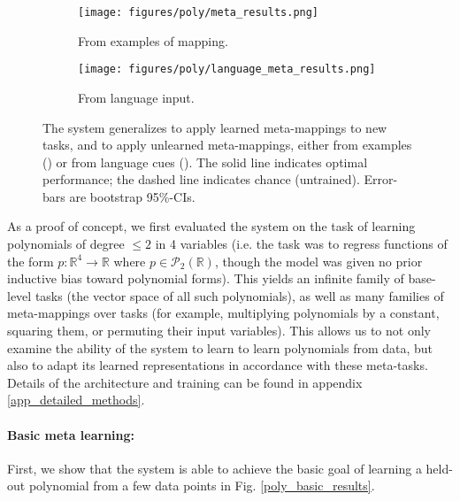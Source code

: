 \documentclass{article}
\begin{document}
\begin{figure}
\centering
\begin{subfigure}{0.5\textwidth}
\texttt{[image: figures/poly/meta\_results.png]}
\caption{From examples of mapping.}
\label{poly_meta_map_results_examples}
\end{subfigure}%
\begin{subfigure}{0.5\textwidth}
\texttt{[image: figures/poly/language\_meta\_results.png]}
\caption{From language input.}
\label{poly_meta_map_results_language}
\end{subfigure}
\caption{The system generalizes to apply learned meta-mappings to new tasks, and to apply unlearned meta-mappings, either from examples () or from language cues (). The solid line indicates optimal performance; the dashed line indicates chance (untrained). Error-bars are bootstrap 95\%-CIs.} 
\label{poly_meta_map_results}
\end{figure}
As a proof of concept, we first evaluated the system on the task of learning polynomials of degree $\leq 2$ in 4 variables (i.e. the task was to regress functions of the form $p: \mathbb{R}^4 \rightarrow \mathbb{R}$ where $p \in \mathcal{P}_2 \left(\mathbb{R}\right)$, though the model was given no prior inductive bias toward polynomial forms). This yields an infinite family of base-level tasks (the vector space of all such polynomials), as well as many families of meta-mappings over tasks (for example, multiplying polynomials by a constant, squaring them, or permuting their input variables). This allows us to not only examine the ability of the system to learn to learn polynomials from data, but also to adapt its learned representations in accordance with these meta-tasks. Details of the architecture and training can be found in appendix \ref{app_detailed_methods}.\par
\vspace{-0.7em}
\paragraph{Basic meta learning:} First, we show that the system is able to achieve the basic goal of learning a held-out polynomial from a few data points in Fig. \ref{poly_basic_results}. \par 
\vspace{-0.7em}
\end{document}

